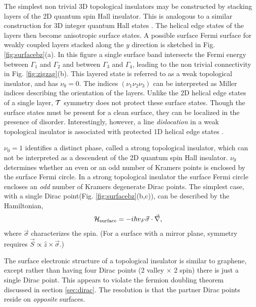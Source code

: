 \documentclass[twocolumn,floatfix,showpacs,rmp,aps]{revtex4}
\begin{document}
	The simplest non trivial 3D topological insulators may be
	constructed by stacking layers of the 2D quantum spin Hall
	insulator.  This is analogous to a similar construction for 3D
	integer quantum Hall states \cite{kohmoto92}.
	The helical edge states of the layers
	then become anisotropic surface states.
	A possible surface Fermi surface for weakly coupled layers stacked along the
	$y$ direction is sketched in Fig. \ref{fig:surfacebz}(a).  In this figure a single
	surface band intersects the Fermi energy between $\Gamma_1$ and $\Gamma_2$ and
	between $\Gamma_3$ and $\Gamma_4$, leading to the non trivial connectivity in
	Fig. \ref{fig:zigzag}(b).  This layered state is referred to as a weak topological
	insulator, and has $\nu_0=0$.
	The indices $(\nu_1\nu_2\nu_3)$ can be interpreted as Miller indices
	describing the orientation of the layers.
	Unlike the 2D helical edge states of a single layer, ${\cal T}$
	symmetry does not protect these surface states.  Though the
	surface states must be present for a clean surface, they
	can be localized in the presence of disorder.
	Interestingly, however, a line {\it dislocation} in
	a weak topological insulator is associated with protected 1D
	helical edge states \cite{ran09}.
	
	$\nu_0=1$ identifies a distinct phase, called a strong topological insulator,
	which can not be interpreted as a
	descendent of the 2D quantum spin Hall insulator.  $\nu_0$ determines
	whether an even or an odd number
	of Kramers points is enclosed by the surface Fermi circle.
	In a strong topological insulator the surface Fermi circle encloses an {\it odd} number of
	Kramers degenerate Dirac points.    The simplest case, with a single Dirac
	point(Fig. \ref{fig:surfacebz}(b,c)), can be described by the Hamiltonian,
	\begin{equation}
		{\cal H}_{\rm surface} = -i\hbar v_F \vec\sigma\cdot\vec\nabla,
		\label{surfacedirac}
	\end{equation}
	where $\vec\sigma$ characterizes the spin.  (For a surface with a mirror plane,
	symmetry requires $\vec S \propto \hat z\times\vec\sigma$.)
	
	The surface electronic structure of a topological insulator is
	similar to graphene, except rather than having four
	Dirac points (2 valley $\times$ 2 spin) there is just a single Dirac
	point.  This appears to violate the fermion doubling theorem \cite{nielssen83}
	discussed in section \ref{sec:dirac}.  The resolution is that the partner
	Dirac points reside on {\it opposite} surfaces.
	
\end{document}
